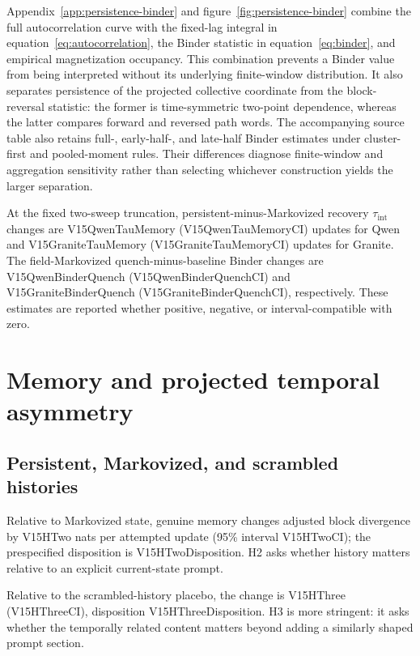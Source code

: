 \documentclass[12pt]{article}
\begin{document}
Appendix~\ref{app:persistence-binder} and figure~\ref{fig:persistence-binder}
combine the full autocorrelation curve with the fixed-lag integral in
equation~\eqref{eq:autocorrelation}, the Binder statistic in
equation~\eqref{eq:binder}, and empirical magnetization occupancy.  This
combination prevents a Binder value from being interpreted without its
underlying finite-window distribution.  It also separates persistence of the
projected collective coordinate from the block-reversal statistic: the former
is time-symmetric two-point dependence, whereas the latter compares forward
and reversed path words.
The accompanying source table also retains full-, early-half-, and late-half
Binder estimates under cluster-first and pooled-moment rules.  Their
differences diagnose finite-window and aggregation sensitivity rather than
selecting whichever construction yields the larger separation.

At the fixed two-sweep truncation, persistent-minus-Markovized recovery
$\tau_{\mathrm{int}}$ changes are \csname V15QwenTauMemory\endcsname{}
(\csname V15QwenTauMemoryCI\endcsname) updates for Qwen and
\csname V15GraniteTauMemory\endcsname{}
(\csname V15GraniteTauMemoryCI\endcsname) updates for Granite.  The
field-Markovized quench-minus-baseline Binder changes are
\csname V15QwenBinderQuench\endcsname{}
(\csname V15QwenBinderQuenchCI\endcsname) and
\csname V15GraniteBinderQuench\endcsname{}
(\csname V15GraniteBinderQuenchCI\endcsname), respectively.  These estimates
are reported whether positive, negative, or interval-compatible with zero.

\clearpage
\section{Memory and projected temporal asymmetry}
\label{sec:memory-results}

\subsection{Persistent, Markovized, and scrambled histories}
\label{sec:persistent-markovized}

Relative to Markovized state, genuine memory changes adjusted block divergence
by \csname V15HTwo\endcsname{} nats per attempted update (95\% interval
\csname V15HTwoCI\endcsname); the prespecified disposition is
\csname V15HTwoDisposition\endcsname{}.  H2 asks whether history matters
relative to an explicit current-state prompt.

Relative to the scrambled-history
placebo, the change is \csname V15HThree\endcsname{}
(\csname V15HThreeCI\endcsname), disposition
\csname V15HThreeDisposition\endcsname{}.  H3 is more stringent: it asks whether the
temporally related content matters beyond adding a similarly shaped prompt
section.
\end{document}
